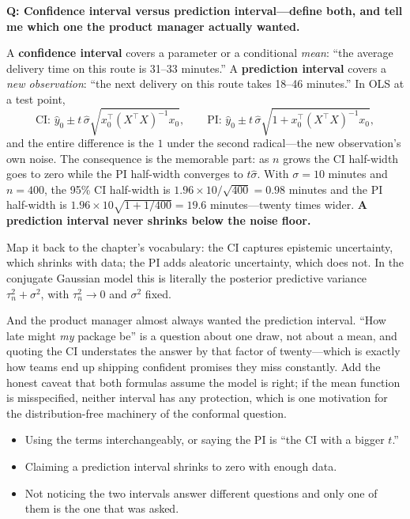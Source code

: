 \begin{interviewq}
\textbf{Q: Confidence interval versus prediction interval---define both, and tell me which one the product manager actually wanted.}

 \quad {} \quad \badgefreq{\freqmed}

\stronganswer

A \textbf{confidence interval} covers a parameter or a conditional \textit{mean}: ``the average delivery time on this route is 31--33 minutes.'' A \textbf{prediction interval} covers a \textit{new observation}: ``the next delivery on this route takes 18--46 minutes.'' In OLS at a test point,
\begin{equation*}
\text{CI: } \hat y_0 \pm t\,\hat\sigma\sqrt{x_0^\top(X^\top X)^{-1}x_0}, \qquad
\text{PI: } \hat y_0 \pm t\,\hat\sigma\sqrt{1 + x_0^\top(X^\top X)^{-1}x_0},
\end{equation*}
and the entire difference is the $1$ under the second radical---the new observation's own noise. The consequence is the memorable part: as $n$ grows the CI half-width goes to zero while the PI half-width converges to $t\hat\sigma$. With $\sigma = 10$ minutes and $n = 400$, the 95\% CI half-width is $1.96 \times 10/\sqrt{400} = 0.98$ minutes and the PI half-width is $1.96 \times 10\sqrt{1+1/400} = 19.6$ minutes---twenty times wider. \textbf{A prediction interval never shrinks below the noise floor.}

Map it back to the chapter's vocabulary: the CI captures epistemic uncertainty, which shrinks with data; the PI adds aleatoric uncertainty, which does not. In the conjugate Gaussian model this is literally the posterior predictive variance $\tau_n^2 + \sigma^2$, with $\tau_n^2 \to 0$ and $\sigma^2$ fixed.

And the product manager almost always wanted the prediction interval. ``How late might \textit{my} package be'' is a question about one draw, not about a mean, and quoting the CI understates the answer by that factor of twenty---which is exactly how teams end up shipping confident promises they miss constantly. Add the honest caveat that both formulas assume the model is right; if the mean function is misspecified, neither interval has any protection, which is one motivation for the distribution-free machinery of the conformal question.

\redflags
\begin{itemize}
    \item Using the terms interchangeably, or saying the PI is ``the CI with a bigger $t$.''
    \item Claiming a prediction interval shrinks to zero with enough data.
    \item Not noticing the two intervals answer different questions and only one of them is the one that was asked.
\end{itemize}


\end{interviewq}

